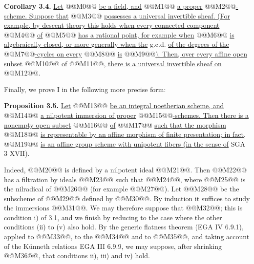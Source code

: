 \textbf{Corollary 3.4.} \uline{Let} @@M0@@ \uline{be a field, and} @@M1@@ \uline{a proper} @@M2@@\uline{-scheme. Suppose that} @@M3@@ \uline{possesses a universal invertible sheaf. (For example, by descent theory this holds when every connected component} @@M4@@ \uline{of} @@M5@@ \uline{has a rational point, for example when} @@M6@@ \uline{is algebraically closed, or more generally when the} g.c.d. \uline{of the degrees of the} @@M7@@\uline{-cycles on every} @@M8@@ \uline{is} @@M9@@\uline{). Then, over every affine open subset} @@M10@@ \uline{of} @@M11@@\uline{, there is a universal invertible sheaf on} @@M12@@.

Finally, we prove I in the following more precise form:

\textbf{Proposition 3.5.} \uline{Let} @@M13@@ \uline{be an integral noetherian scheme, and} @@M14@@ \uline{a nilpotent immersion of proper} @@M15@@\uline{-schemes. Then there is a nonempty open subset} @@M16@@ \uline{of} @@M17@@ \uline{such that the morphism}
@@M18@@
\uline{is representable by an affine morphism of finite presentation; in fact,} @@M19@@ \uline{is an affine group scheme with unipotent fibers (in the sense of} SGA 3 XVII).

Indeed, @@M20@@ is defined by a nilpotent ideal @@M21@@. Then @@M22@@ has a filtration by ideals @@M23@@ such that @@M24@@, where @@M25@@ is the nilradical of @@M26@@ (for example @@M27@@). Let @@M28@@ be the subscheme of @@M29@@ defined by @@M30@@. By induction it suffices to study the immersions @@M31@@. We may therefore suppose that @@M32@@; this is condition i) of 3.1, and we finish by reducing to the case where the other conditions (ii) to (v) also hold. By the generic flatness theorem (EGA IV 6.9.1), applied to @@M33@@, to the @@M34@@ and to @@M35@@, and taking account of the Künneth relations EGA III 6.9.9, we may suppose, after shrinking @@M36@@, that conditions ii), iii) and iv) hold.

